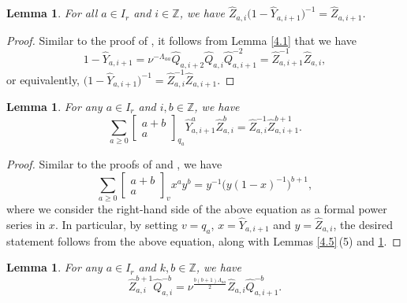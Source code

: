 \documentclass[pdftex]{sigma}
\numberwithin{equation}{section}
\newtheorem{Lemma}[Theorem]{Lemma}
\begin{document}
\begin{Lemma}\label{4.6}
For all $a\in I_r$ and $i\in\mathbb{Z}$, we have $\widehat{Z}_{a,i}\bigl(1-\widehat{Y}_{a,i+1}\bigr)^{-1} =\widehat{Z}_{a,i+1}$.
\end{Lemma}

\begin{proof}
Similar to the proof of \cite[Lemma 4.5]{Lin21}, it follows from Lemma \ref{4.1} that we have
\begin{equation*}
1-\widehat{Y}_{a,i+1}
=\nu^{-\Lambda_{aa}}\widehat{Q}_{a, i+2}\widehat{Q}_{a,i}\widehat{Q}_{a,i+1}^{-2}
=\widehat{Z}_{a,i+1}^{-1}\widehat{Z}_{a,i},
\end{equation*}
or equivalently, $\bigl(1-\widehat{Y}_{a,i+1}\bigr)^{-1}= \widehat{Z}_{a,i}^{-1}\widehat{Z}_{a,i+1}$.
\end{proof}

\begin{Lemma}\label{4.7}
For any $a\in I_r$ and $i,b\in\mathbb{Z}$, we have
\begin{equation*}
\sum_{a\geq0}\begin{bmatrix}a+b\\a\end{bmatrix}_{q_a}\widehat{Y}_{a,i+1}^a\widehat{Z}_{a,i}^b=\widehat{Z}_{a,i}^{-1}\widehat{Z}_{a,i+1}^{b+1}.
\end{equation*}
\end{Lemma}

\begin{proof}
Similar to the proofs of \cite[Lemma 4.7]{DFK14} and \cite[Lemma 4.6]{Lin21}, we have
\begin{equation*}
\sum_{a\geq0}\begin{bmatrix}a+b\\a\end{bmatrix}_vx^ay^b=y^{-1}\bigl(y(1-x)^{-1}\bigr)^{b+1},
\end{equation*}
where we consider the right-hand side of the above equation as a formal power series in $x$. In particular, by setting $v=q_a$, $x=\widehat{Y}_{a,i+1}$ and $y=\widehat{Z}_{a,i}$, the desired statement follows from the above equation, along with Lemmas \ref{4.5}\,(5) and \ref{4.6}.
\end{proof}

\begin{Lemma}\label{4.8}
For any $a\in I_r$ and $k,b\in\mathbb{Z}$, we have
\begin{equation*}
\widehat{Z}_{a,i}^{b+1}\widehat{Q}_{a,i}^{-b}
=\nu^{\frac{b(b+1)\Lambda_{aa}}{2}}\widehat{Z}_{a,i}\widehat{Q}_{a,i+1}^{-b}.
\end{equation*}
\end{Lemma}
\end{document}
